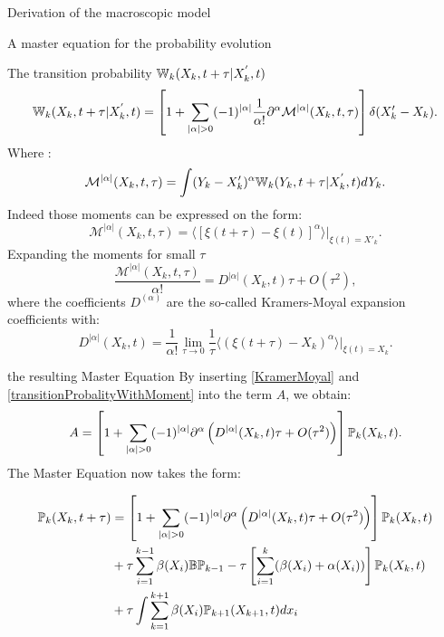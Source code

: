 \begin{paragraph}{Derivation of the macroscopic model}
\begin{paragraph}{A master equation for the probability evolution}
\begin{paragraph}{The transition probability ${\mathbb{W}}_k(X_k, t+\tau \vert X_k^{'},t)$}
\begin{equation}
{\mathbb{W}}_k(X_k, t+\tau \vert X_k^{'},t) = \left[1 + \sum_{\vert \alpha \vert >0} (-1)^{\vert \alpha \vert} \dfrac{1}{\alpha !} {\partial}^{\alpha}  \mathcal{M}^{\vert \alpha \vert} (X_k,t,\tau) \right] \delta(X'_k - X_k).
\end{equation}
Where : 
\begin{equation}
\label{moments}
\mathcal{M}^{\vert \alpha \vert} (X_k,t,\tau) = \int (Y_k - X'_k)^{\alpha} {\mathbb{W}}_k(Y_k, t+\tau \vert X_k^{'},t)dY_k.
\end{equation}
Indeed those moments can be expressed on the form: 
\begin{equation}
\mathcal{M}^{\vert \alpha \vert} (X_k,t,\tau)  = \langle \left[ \xi(t+\tau) - \xi(t) \right]^{\alpha} \rangle |_{\xi(t)=X'_k}. 
\end{equation}
Expanding the moments for small $\tau$
\begin{equation}
\label{KramerMoyal}
\dfrac{\mathcal{M}^{\vert \alpha \vert} (X_k,t,\tau) }{\alpha!} = D^{\vert \alpha \vert} (X_k, t)\tau + O(\tau^2),
\end{equation}
where the coefficients $D^{(\alpha)}$ are the so-called Kramers-Moyal expansion coefficients with:
\begin{equation}
D^{\vert \alpha \vert} (X_k, t) = \dfrac{1}{\alpha !} \lim_{\tau \rightarrow 0} \dfrac{1}{\tau} \langle (\xi(t+\tau) - X_k)^{\alpha} \rangle \vert_{\xi(t)=X_k}.
\end{equation}

\begin{paragraph}{the resulting Master Equation}
By inserting \eqref{KramerMoyal} and \eqref{transitionProbalityWithMoment} into the term $A$, we obtain: 
\begin{equation}
A = \left[ 1 + \sum_{\vert \alpha \vert >0} (-1)^{\vert \alpha \vert}  {\partial}^{\alpha} \left(D^{\vert \alpha \vert} (X_k, t) \tau + O(\tau^2) \right) \right] {\mathbb{P}}_k(X_k,t).
\end{equation}
The Master Equation now takes the form: 

\begin{align}
\label{masterEquation1}
{\mathbb{P}}_k(X_k, t+\tau) &= \left[ 1 + \sum_{\vert \alpha \vert >0} (-1)^{\vert \alpha \vert}  {\partial}^{\alpha} \left(D^{\vert \alpha \vert} (X_k, t) \tau + O(\tau^2) \right) \right] {\mathbb{P}}_k(X_k,t) \nonumber \\ 
&+ \tau \sum_{i=1}^{k-1}\beta(X_i) {\mathbb{B}} {\mathbb{P}}_{k-1} - \tau \left[ \sum_{i=1}^{k} (\beta(X_i) + \alpha(X_i)) \right] {\mathbb{P}}_k(X_k,t) \\ 
&+ \tau \int \sum_{k=1}^{k+1} \beta(X_i) {\mathbb{P}}_{k+1}(X_{k+1}, t)dx_i \nonumber
\end{align}


\end{paragraph}
\end{paragraph}
\end{paragraph}
\end{paragraph}
